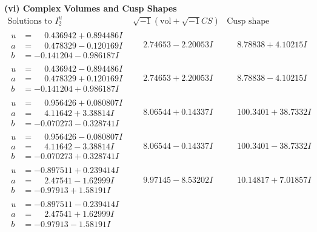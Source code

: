 \documentclass[1p]{elsarticle_modified}
\theoremstyle{definition}
\newcommand{\I}{\sqrt{-1}}
\begin{document}
\newpage\flushleft \textbf{(vi) Complex Volumes and Cusp Shapes}
$$\begin{array}{c|c|c}  
\text{Solutions to }I^u_{2}& \I (\text{vol} + \sqrt{-1}CS) & \text{Cusp shape}\\
 \hline 
\begin{aligned}
u &= \phantom{-}0.436942 + 0.894486 I \\
a &= \phantom{-}0.478329 - 0.120169 I \\
b &= -0.141204 - 0.986187 I\end{aligned}
 & \phantom{-}2.74653 - 2.20053 I & \phantom{-}8.78838 + 4.10215 I \\ \hline\begin{aligned}
u &= \phantom{-}0.436942 - 0.894486 I \\
a &= \phantom{-}0.478329 + 0.120169 I \\
b &= -0.141204 + 0.986187 I\end{aligned}
 & \phantom{-}2.74653 + 2.20053 I & \phantom{-}8.78838 - 4.10215 I \\ \hline\begin{aligned}
u &= \phantom{-}0.956426 + 0.080807 I \\
a &= \phantom{-}4.11642 + 3.38814 I \\
b &= -0.070273 - 0.328741 I\end{aligned}
 & \phantom{-}8.06544 + 0.14337 I & \phantom{-}100.3401 + 38.7332 I \\ \hline\begin{aligned}
u &= \phantom{-}0.956426 - 0.080807 I \\
a &= \phantom{-}4.11642 - 3.38814 I \\
b &= -0.070273 + 0.328741 I\end{aligned}
 & \phantom{-}8.06544 - 0.14337 I & \phantom{-}100.3401 - 38.7332 I \\ \hline\begin{aligned}
u &= -0.897511 + 0.239414 I \\
a &= \phantom{-}2.47541 - 1.62999 I \\
b &= -0.97913 + 1.58191 I\end{aligned}
 & \phantom{-}9.97145 - 8.53202 I & \phantom{-}10.14817 + 7.01857 I \\ \hline\begin{aligned}
u &= -0.897511 - 0.239414 I \\
a &= \phantom{-}2.47541 + 1.62999 I \\
b &= -0.97913 - 1.58191 I\end{aligned}

\end{array}$$
\end{document}
